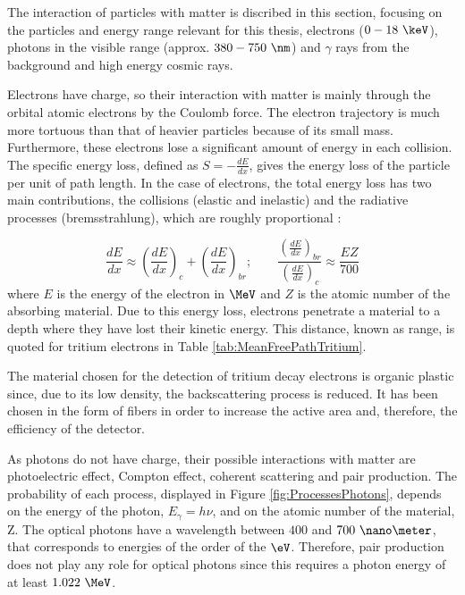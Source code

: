 The interaction of particles with matter is discribed in this section, focusing on the particles and energy range relevant for this thesis, electrons ($0-18~\keV$), photons in the visible range (approx. $380-750~\nm$) and $\gamma$ rays from the background and high energy cosmic rays.

Electrons have charge, so their interaction with matter is mainly through the orbital atomic  electrons by the Coulomb force. The electron trajectory is much more tortuous than that of heavier particles because of its small mass. Furthermore, these electrons lose a significant amount of energy in each collision. The specific energy loss, defined as $S=-\displaystyle{\frac{dE}{dx}}$, gives the energy loss of the particle per unit of path length. In the case of electrons, the total energy loss has two main contributions, the collisions (elastic and inelastic) and the radiative processes (bremsstrahlung), which are roughly proportional \cite{Knoll, Leo}:

\begin{equation}
\frac{dE}{dx} \approx \left(\frac{dE}{dx}\right)_{c} + \left(\frac{dE}{dx}\right)_{br} ; \qquad \frac{\displaystyle{\left(\frac{dE}{dx}\right)_{br}}}{\displaystyle{\left(\frac{dE}{dx}\right)_{c}}} \approx \frac{EZ}{700}
\label{eq:ElectronInteraction}
\end{equation}
where $E$ is the energy of the electron in $\MeV$ and $Z$ is the atomic number of the absorbing material. Due to this energy loss, electrons penetrate a material to a depth where they have lost their kinetic energy. This distance, known as range, is quoted for tritium electrons in Table \ref{tab:MeanFreePathTritium}. 

The material chosen for the detection of tritium decay electrons is organic plastic since, due to its low density, the backscattering process is reduced. It has been chosen in the form of fibers in order to increase the active area and, therefore, the efficiency of the detector.

As photons do not have charge, their possible interactions with matter are photoelectric effect, Compton effect, coherent scattering and pair production. The probability of each process, displayed in Figure \ref{fig:ProcessesPhotons}, depends on the energy of the photon, $E_\gamma = h\nu$, and on the atomic number of the material, Z. The optical photons have a wavelength between $400$ and $700~\nano\meter$, that corresponds to energies of the order of the $\eV$. Therefore, pair production does not play any role for optical photons since this requires a photon energy of at least $1.022~\MeV$.


